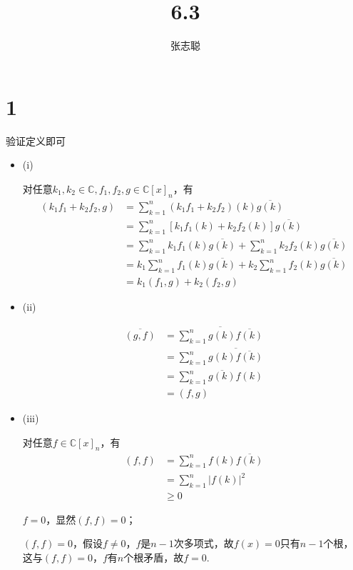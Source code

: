 \documentclass{article}
\begin{document}
\title{6.3}
\author{张志聪}
\maketitle

\section*{1}

验证定义即可
\begin{itemize}
  \item (i)

        对任意$k_1, k_2 \in \mathbb{C}, f_1, f_2, g \in \mathbb{C}[x]_n$，有
        \begin{align*}
          (k_1 f_1 + k_2 f_2, g)
           & = \sum \limits_{k = 1}^n (k_1 f_1 + k_2 f_2)(k) \overline{g(k)}                                           \\
           & = \sum \limits_{k = 1}^n [k_1 f_1(k) + k_2 f_2(k)] \overline{g(k)}                                        \\
           & = \sum \limits_{k = 1}^n k_1 f_1(k)  \overline{g(k)} + \sum \limits_{k = 1}^n k_2 f_2(k)  \overline{g(k)} \\
           & = k_1 \sum \limits_{k = 1}^n f_1(k)  \overline{g(k)} + k_2 \sum \limits_{k = 1}^n f_2(k)  \overline{g(k)} \\
           & = k_1 (f_1, g) + k_2 (f_2, g)
        \end{align*}

  \item (ii)

        \begin{align*}
          \overline{(g, f)}
           & = \overline{\sum \limits_{k = 1}^n g(k) \overline{f(k)}} \\
           & = \sum \limits_{k = 1}^n \overline{g(k) \overline{f(k)}} \\
           & = \sum \limits_{k = 1}^n \overline{g(k)} f(k)            \\
           & = (f, g)
        \end{align*}

  \item (iii)

        对任意$f \in \mathbb{C}[x]_n$，有
        \begin{align*}
          (f, f) & = \sum \limits_{k = 1}^n f(k) \overline{f(k)} \\
                 & = \sum \limits_{k = 1}^n |f(k)|^2             \\
                 & \geq 0
        \end{align*}

        $f = 0$，显然$(f, f) = 0$；

        $(f, f) = 0$，假设$f \neq 0$，$f$是$n - 1$次多项式，故$f(x) = 0$只有$n - 1$个根，
        这与$(f, f) = 0$，$f$有$n$个根矛盾，故$f = 0$.
\end{itemize}
\end{document}
